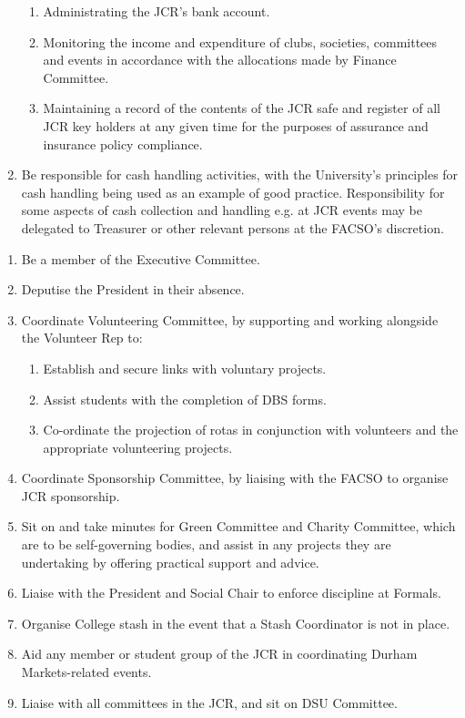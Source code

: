 \begin{enumerate}
\begin{enumerate}
            \item Administrating the JCR’s bank account.
            \item Monitoring the income and expenditure of clubs, societies, committees and events in accordance with the allocations made by Finance Committee.
            \item Maintaining a record of the contents of the JCR safe and register of all JCR key holders at any given time for the purposes of assurance and insurance policy compliance.
        \end{enumerate}
    \item Be responsible for cash handling activities, with the University’s principles for cash handling being used as an example of good practice. Responsibility for some aspects of cash collection and handling e.g. at JCR events may be delegated to Treasurer or other relevant persons at the FACSO’s discretion. 
\end{enumerate}

\begin{enumerate}
    \item Be a member of the Executive Committee.
    \item Deputise the President in their absence.
    \item Coordinate Volunteering Committee, by supporting and working alongside the Volunteer Rep to:
        \begin{enumerate}
            \item Establish and secure links with voluntary projects.
            \item Assist students with the completion of DBS forms.
            \item Co-ordinate the projection of rotas in conjunction with volunteers and the appropriate volunteering projects.
        \end{enumerate}
    \item Coordinate Sponsorship Committee, by liaising with the FACSO to organise JCR sponsorship.
    \item Sit on and take minutes for Green Committee and Charity Committee, which are to be self-governing bodies, and assist in any projects they are undertaking by offering practical support and advice.
    \item Liaise with the President and Social Chair to enforce discipline at Formals.
    \item Organise College stash in the event that a Stash Coordinator is not in place.
    \item Aid any member or student group of the JCR in coordinating Durham Markets-related events.
    \item Liaise with all committees in the JCR, and sit on DSU Committee.
\end{enumerate}

